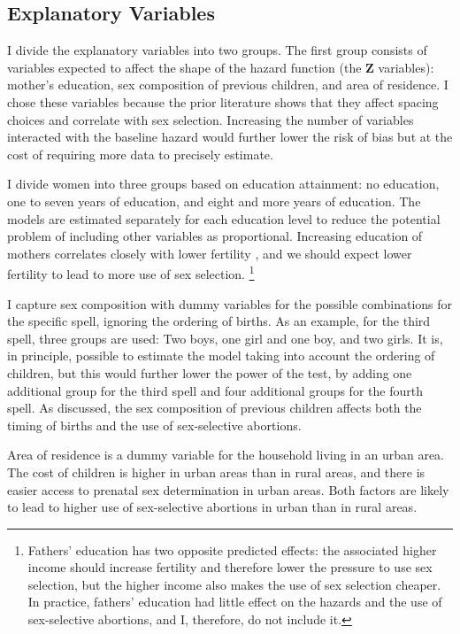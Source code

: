 \documentclass[12pt,letterpaper]{article}
\begin{document}
\subsection{Explanatory Variables}

I divide the explanatory variables into two groups.
The first group consists of variables expected to affect the shape of the hazard function
(the $\mathbf{Z}$ variables): 
mother's education, sex composition of previous children, and area of residence.
I chose these variables because the prior literature shows that they affect 
spacing choices and correlate with sex selection.
Increasing the number of variables interacted with the baseline hazard would
further lower the risk of bias but at the cost of requiring more data to 
precisely estimate.

I divide women into three groups based on education attainment: no
education, one to seven years of education, and eight and more years of education.
The models are estimated separately for each education level to reduce
the potential problem of including other variables as proportional.
Increasing education of mothers correlates closely with lower fertility 
\citep{schultz97}, and 
we should expect lower fertility to lead to more use of sex selection.%
\footnote{
Fathers' education has two opposite predicted effects: the associated higher income
should increase fertility and therefore lower the pressure to use sex selection, but
the higher income also makes the use of sex selection cheaper.
In practice, fathers' education had little effect on the hazards and the use of 
sex-selective abortions, and I, therefore, do not include it.
}

I capture sex composition with dummy variables for the
possible combinations for the specific spell, ignoring the ordering of births.
As an example, for the third spell, three groups are used: Two boys,
one girl and one boy, and two girls.
It is, in principle, possible to estimate the model taking into account
the ordering of children, but this would further lower the power of the
test, by adding one additional group for the third spell and four
additional groups for the fourth spell. 
As discussed, the sex composition of previous children affects both the timing
of births and the use of sex-selective abortions.

Area of residence is a dummy variable for the household living in
an urban area.
The cost of children is higher in urban areas than in rural areas, and 
there is easier access to prenatal sex determination in urban areas.
Both factors are likely to lead to higher use of sex-selective abortions
in urban than in rural areas.
\end{document}
